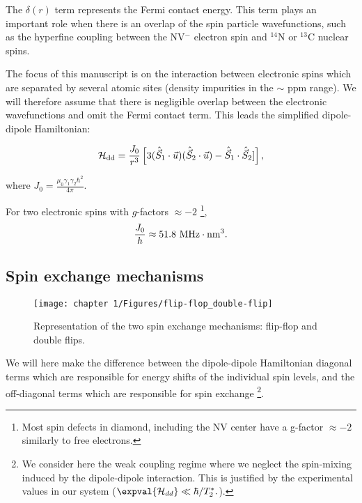 \documentclass[a4paper, 11pt]{report}
\begin{document}
The $\delta(r)$ term represents the Fermi contact energy. This term plays an important role when there is an overlap of the spin particle wavefunctions, such as the hyperfine coupling between the NV$^-$ electron spin and $^{14}$N \cite{doherty2012theory} or $^{13}$C \cite{smeltzer201113c} nuclear spins.

The focus of this manuscript is on the interaction between electronic spins which are separated by several atomic sites (density impurities in the $\sim$ ppm range). We will therefore assume that there is negligible overlap between the electronic wavefunctions and omit the Fermi contact term. This leads the simplified dipole-dipole Hamiltonian:

\begin{equation}
\mathcal{H}_{\rm dd}= \frac{J_0}{r^3}\left[ 3 (\hat{\vec{S}}_1\cdot\vec{u})(\hat{\vec{S}}_2\cdot\vec{u}) - \hat{\vec{S}}_1\cdot\hat{\vec{S}}_2] \right],
\end{equation}

where $J_0=\frac{\mu_0 \gamma_1 \gamma_2 \hbar^2}{4 \pi}$.

For two electronic spins with $g$-factors $\approx -2$ \footnote{Most spin defects in diamond, including the NV center have a g-factor $\approx -2$ similarly to free electrons.}, 
\begin{equation*}
\frac{J_0}{h} \approx 51.8\ \rm{MHz}\cdot \rm{nm}^3.
\end{equation*}

\subsection{Spin exchange mechanisms}
\label{sec flip-flop et double flip}

\begin{figure}[h!]
\centering
\texttt{[image: chapter 1/Figures/flip-flop\_double-flip]}
\caption{Representation of the two spin exchange mechanisms: flip-flop and double flips.} 
\label{flip flop double flip}
\end{figure}

We will here make the difference between the dipole-dipole Hamiltonian diagonal terms which are responsible for energy shifts of the individual spin levels, and the off-diagonal terms which are responsible for spin exchange \footnote{We consider here the weak coupling regime where we neglect the spin-mixing induced by the dipole-dipole interaction. This is justified by the experimental values in our system ($\expval{\mathcal{H}_{dd}} \ll \hbar/T_2^*.$).}.
\end{document}
